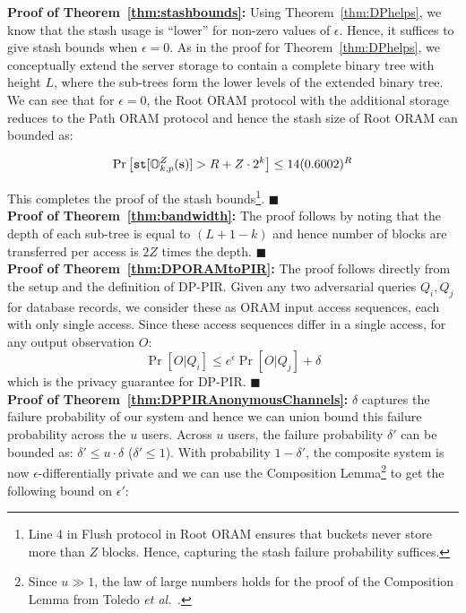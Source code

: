 \documentclass[USenglish,oneside,twocolumn]{article}
\newcommand{\ourprotocol}{Root ORAM}
\newcommand{\etal}{\textit{et al}.}
\begin{document}
\textbf{Proof of Theorem~\ref{thm:stashbounds}: }Using Theorem~\ref{thm:DPhelps}, we know that the stash usage is ``lower'' for non-zero values of $\epsilon$. Hence, it suffices to give stash bounds when $\epsilon = 0$. As in the proof for Theorem~\ref{thm:DPhelps}, we conceptually extend the server storage to contain a complete binary tree with height $L$, where the sub-trees form the lower levels of the extended binary tree. We can see that for $\epsilon = 0$, the \ourprotocol{} protocol with the additional storage reduces to the Path ORAM protocol and hence the stash size of \ourprotocol{} can bounded as: 

\begin{equation}
\Pr \left[{\tt st} [\mathbb{O}_{k,p}^Z (\textbf{s}) ] > R + Z \cdot 2^k \right] \leq 14 (0.6002)^R
\end{equation}

This completes the proof of the stash bounds\footnote{Line 4 in Flush protocol in \ourprotocol{} ensures that buckets never store more than $Z$ blocks. Hence, capturing the stash failure probability suffices.}. $\blacksquare $\\

\textbf{Proof of Theorem~\ref{thm:bandwidth}: }The proof follows by noting that the depth of each sub-tree is equal to $(L + 1 - k)$ and hence number of blocks are transferred per access is $2Z$ times the depth. $\blacksquare $\\


\textbf{Proof of Theorem~\ref{thm:DPORAMtoPIR}: }The proof follows directly from the setup and the definition of DP-PIR. Given any two adversarial queries $Q_i, Q_j$ for database records, we consider these as ORAM input access sequences, each with only single access. Since these access sequences differ in a single access, for any output observation $O$:
\begin{equation}
\Pr [O|Q_i] \leq e^{\epsilon} \Pr [O|Q_j] + \delta
\end{equation}
which is the privacy guarantee for DP-PIR. $\blacksquare$\\

\textbf{Proof of Theorem~\ref{thm:DPPIRAnonymousChannels}: }$\delta$ captures the failure probability of our system and hence we can union bound this failure probability across the $u$ users. Across $u$ users, the failure probability $\delta'$ can be bounded as: $\delta' \leq u \cdot \delta$ ($\delta'  \leq 1$). With probability $1-\delta'$, the composite system is now $\epsilon$-differentially private and we can use the Composition Lemma\footnote{Since $u \gg 1$, the law of large numbers holds for the proof of the Composition Lemma from Toledo \etal~\cite{goldbergDPPIR}.} to get the following bound on $\epsilon'$:
\end{document}
